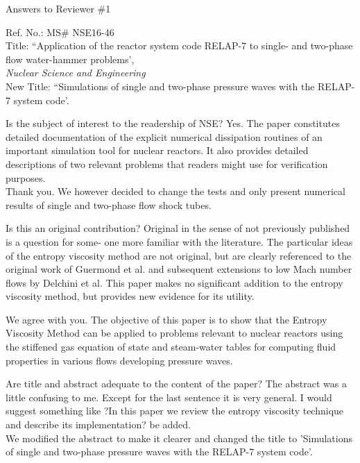 \documentclass{article}
\begin{document}
\begin{center}
{ \Large Answers to Reviewer \#1}
\end{center}

\bigskip

\noindent Ref. No.: MS\# NSE16-46\\
Title: ``Application of the reactor system code RELAP-7 to single- and two-phase flow water-hammer problems', \\
{\it Nuclear Science and Engineering}\\
New Title: ``Simulations of single and two-phase pressure waves with the RELAP-7 system code'.
\bigskip
\bigskip

{\color{blue}
Is the subject of interest to the readership of NSE?
Yes. The paper constitutes detailed documentation of the explicit numerical dissipation routines of an important simulation tool for nuclear reactors. It also provides detailed descriptions of two relevant problems that readers might use for verification purposes. \\
}
Thank you. We however decided to change the tests and only present numerical results of single and two-phase flow shock tubes.

\bigskip

{\color{blue}
Is this an original contribution?
Original in the sense of not previously published is a question for some- one more familiar with the literature.
The particular ideas of the entropy viscosity method are not original, but are clearly referenced to the original work of Guermond et al. and subsequent extensions to low Mach number flows by Delchini et al. This paper makes no significant addition to the entropy viscosity method, but provides new evidence for its utility. \\
}

We agree with you. The objective of this paper is to show that the Entropy Viscosity Method can be applied to problems relevant to nuclear reactors using the stiffened gas equation of state and steam-water tables for computing fluid properties in various flows developing pressure waves.

\bigskip

{\color{blue}
Are title and abstract adequate to the content of the paper?
The abstract was a little confusing to me. Except for the last sentence it is very general. I would suggest something like ?In this paper we review the entropy viscosity technique and describe its implementation? be added. \\
}
We modified the abstract to make it clearer and changed the title to 'Simulations of single and two-phase pressure waves with the RELAP-7 system code'. 
\end{document}
